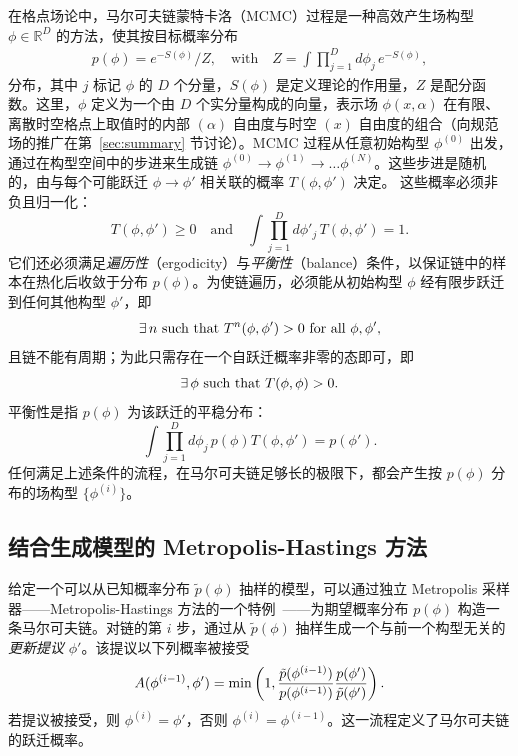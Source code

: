 在格点场论中，马尔可夫链蒙特卡洛（MCMC）过程是一种高效产生场构型 $\phi \in \mathbb{R}^D$ 的方法，使其按目标概率分布
\begin{equation}
\begin{aligned}
    p(\phi) = e^{-S(\phi)} / Z, \quad
    \text{with}\quad Z =\int \prod_{j=1}^D d\phi_j \,e^{-S(\phi)},
\end{aligned}
\end{equation}
分布，其中 $j$ 标记 $\phi$ 的 $D$ 个分量，$S(\phi)$ 是定义理论的作用量，$Z$ 是配分函数。这里，$\phi$ 定义为一个由 $D$ 个实分量构成的向量，表示场 $\phi(x,\alpha)$ 在有限、离散时空格点上取值时的内部 $(\alpha)$ 自由度与时空 $(x)$ 自由度的组合（向规范场的推广在第~\ref{sec:summary} 节讨论）。MCMC 过程从任意初始构型 $\phi^{(0)}$ 出发，通过在构型空间中的步进来生成链 $\phi^{(0)} \rightarrow \phi^{(1)} \rightarrow \ldots \phi^{(N)}$。这些步进是随机的，由与每个可能跃迁 $\phi \rightarrow \phi'$ 相关联的概率 $T(\phi,\phi')$ 决定。
这些概率必须非负且归一化：
%
\begin{equation}
    T(\phi,\phi')\ge 0
    \quad \text{and} \quad
    \int\prod_{j=1}^D d\phi'_j \, T(\phi,\phi') = 1.
\end{equation}
%
它们还必须满足{\it 遍历性}（ergodicity）与{\it 平衡性}（balance）条件，以保证链中的样本在热化后收敛于分布 $p(\phi)$。为使链遍历，必须能从初始构型 $\phi$ 经有限步跃迁到任何其他构型 $\phi'$，即
%
\begin{equation}
    \operatorname{\exists} n \text{ such that } T^n(\phi,\phi')> 0 \text{ for all } \phi, \phi',
\end{equation}
%
%
且链不能有周期；为此只需存在一个自跃迁概率非零的态即可，即
%
\begin{equation}
    \operatorname{\exists} \phi \text{ such that } T(\phi,\phi) > 0.
\end{equation}
%
平衡性是指 $p(\phi)$ 为该跃迁的平稳分布：
%
\begin{equation}
    \int \prod_{j=1}^D d\phi_j \, p(\phi) T(\phi,\phi') = p(\phi').
\end{equation}
%
任何满足上述条件的流程，在马尔可夫链足够长的极限下，都会产生按 $p(\phi)$ 分布的场构型 $\{\phi^{(i)}\}$。

\subsection{结合生成模型的 Metropolis-Hastings 方法}
\label{subsec:generative-metropolis}
%
给定一个可以从已知概率分布 $\tilde{p}(\phi)$ 抽样的模型，可以通过独立 Metropolis 采样器——Metropolis-Hastings 方法的一个特例~\cite{tierney1994}——为期望概率分布 $p(\phi)$ 构造一条马尔可夫链。对链的第 $i$ 步，通过从 $\tilde{p}(\phi)$ 抽样生成一个与前一个构型无关的{\it 更新提议} $\phi'$。该提议以下列概率被接受
%
\begin{equation}
A(\phi^{(i-1)},\phi') = \min\left(1, \frac{\tilde{p}(\phi^{(i-1)}) }{ p(\phi^{(i-1)})} \frac{p(\phi')}{\tilde{p}(\phi')}\right).
\label{eq:acc-rej}
\end{equation}
%
%
若提议被接受，则 $\phi^{(i)} = \phi'$，否则 $\phi^{(i)} = \phi^{(i-1)}$。这一流程定义了马尔可夫链的跃迁概率。

